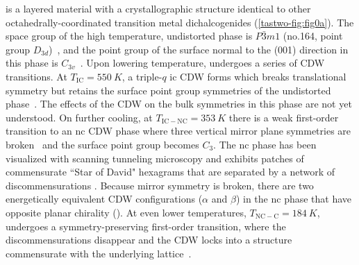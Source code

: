 \tastwo is a layered material with a crystallographic structure identical to other octahedrally-coordinated transition metal dichalcogenides (\cref{tastwo-fig:fig0a}).
The space group of the high temperature, undistorted phase is $P\bar{3}m1$ (no.164, point group $D_{3d}$)~\citep{spijkerman_x-ray_1997}, and the point group of the surface normal to the (001) direction in this phase is $C_{3v}$~\citep{scruby_role_1975, fung_application_1980}.
Upon lowering temperature, \tastwo undergoes a series of CDW transitions.
At $T_{\mathrm{IC}}=\qty{550}{K}$, a triple-$q$ \gls{ic} CDW forms which breaks translational symmetry but retains the surface point group symmetries of the undistorted phase~\citep{scruby_role_1975, fung_application_1980}.
The effects of the CDW on the bulk symmetries in this phase are not yet understood.
On further cooling, at $T_{\mathrm{IC-NC}}=\qty{353}{K}$ there is a weak first-order transition to an \gls{nc} CDW phase where three vertical mirror plane symmetries are broken~\citep{spijkerman_x-ray_1997} and the surface point group becomes $C_3$.
The \gls{nc} phase has been visualized with scanning tunneling microscopy and exhibits patches of commensurate ``Star of David" hexagrams that are separated by a network of discommensurations \citep{wu_hexagonal_1989}.
Because mirror symmetry is broken, there are two energetically equivalent CDW configurations ($\alpha$ and $\beta$) in the \gls{nc} phase that have opposite planar chirality ().
At even lower temperatures, $T_{\mathrm{NC-C}}=\qty{184}{K}$, \tastwo undergoes a symmetry-preserving first-order transition, where the discommensurations disappear and the CDW locks into a structure commensurate with the underlying lattice~\citep{ishiguro_high-resolution_1995}.

